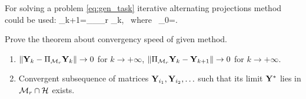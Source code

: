 \documentclass[12pt,a4paper,fleqn,leqno]{article}
\begin{document}
For solving a problem \eqref{eq:gen_task} iterative alternating projections method could be used:
\be
   \bfY_{k+1}=\Pi_\calH \Pi_{\calM_r} \bfY_{k}, \mbox{\ where\ } \bfY_{0}=\bfX.
\ee

Prove the theorem about convergency speed of given method.

\begin{theorem}
\label{th:converg}
\begin{enumerate}
Let space $\calM_r$ be closed in topology raised by norm $\|\cdot\|$. Then
\item $\|\mathbf{Y}_k - \Pi_{\mathcal{M}_r}\mathbf{Y}_k\| \to 0$ for $k \to +\infty$, $\|\Pi_{\mathcal{M}_r}\mathbf{Y}_k - \mathbf{Y}_{k+1}\| \to 0$ for $k \to +\infty$.
\item Convergent subsequence of matrices $\mathbf{Y}_{i_1}, \mathbf{Y}_{i_2}, \ldots$ such that its limit $\mathbf{Y}^*$ lies in $\mathcal{M}_r \cap \mathcal{H}$ exists.
\end{enumerate}
\end{theorem}
\end{document}
